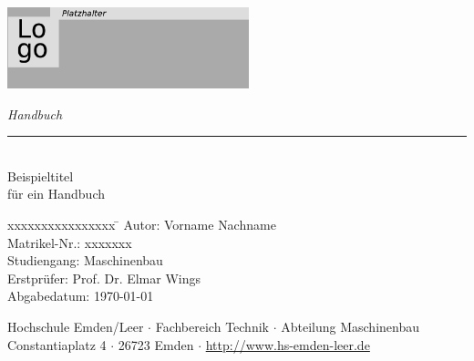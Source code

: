 %
%

\begin{titlepage}
    
    \begin{flushleft} 
        \includegraphics[width=7cm]{General/Logo.png}
    \end{flushleft} 
    
    \begin{flushright}
        \vspace{2cm}
        \LARGE \textsl{Handbuch}\\
        \rule{0.6\textwidth}{0.4pt} ~\\
        \vspace{0.5cm}
        \textsf{\LARGE Beispieltitel}\\
        \textsf{\LARGE für ein Handbuch}
    \end{flushright}
    
    \vspace{3cm}
    \large
    \begin{tabbing}
        xxxxxxxxxxxxxxxx \= \kill
        Autor: \> Vorname Nachname \\
        Matrikel-Nr.: \> xxxxxxx \\
        Studiengang: \> Maschinenbau \\ [0.5cm]
        Erstprüfer: \> Prof. Dr. Elmar Wings \\
        Abgabedatum: \> \today \\
    \end{tabbing}
    
    \vspace{3cm}
    \small
    \begin{center}
        Hochschule Emden/Leer $\cdot$ 
        Fachbereich Technik $\cdot$ 
        Abteilung Maschinenbau \\
        Constantiaplatz 4 $\cdot$ 
        26723 Emden $\cdot$ 
        \url{http://www.hs-emden-leer.de}
    \end{center}
    
\end{titlepage}
